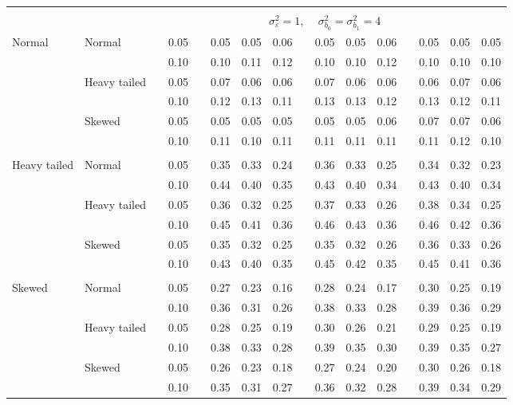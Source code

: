 \documentclass[12pt]{article} %
\begin{document}
\begin{table}[ht]
\begin{scriptsize}
\begin{center}
\begin{tabular}{ll p{.1cm} c p{.1cm} rrr p{.1cm} rrr p{.1cm} rrr}
&&&&&&&&&&&&&&&\\
& && && \multicolumn{9}{c}{$\sigma_{\varepsilon}^2 = 1$, \ \ $\sigma_{b_0}^2 = \sigma_{b_1}^2 = 4$} \\ \cline{6-16}
\rowcolor{gray!20}Normal       & Normal       && 0.05 &&   0.05 & 0.05 & 0.06 && 0.05 & 0.05 & 0.06 &&  0.05 & 0.05 & 0.05 \\
\rowcolor{gray!20}             &              && 0.10 &&   0.10 & 0.11 & 0.12 && 0.10 & 0.10 & 0.12 &&  0.10 & 0.10 & 0.10 \\
\rowcolor{gray!20}             & Heavy tailed && 0.05 &&   0.07 & 0.06 & 0.06 && 0.07 & 0.06 & 0.06 &&  0.06 & 0.07 & 0.06 \\
\rowcolor{gray!20}             &              && 0.10 &&   0.12 & 0.13 & 0.11 && 0.13 & 0.13 & 0.12 &&  0.13 & 0.12 & 0.11 \\
\rowcolor{gray!20}             & Skewed       && 0.05 &&   0.05 & 0.05 & 0.05 && 0.05 & 0.05 & 0.06 &&  0.07 & 0.07 & 0.06 \\
\rowcolor{gray!20}             &              && 0.10 &&   0.11 & 0.10 & 0.11 && 0.11 & 0.11 & 0.11 &&  0.11 & 0.12 & 0.10 \\
             &&&&&&&&&&&&&&&\\
Heavy tailed & Normal       && 0.05 &&   0.35 & 0.33 & 0.24 && 0.36 & 0.33 & 0.25 && 0.34 & 0.32 & 0.23 \\
             &              && 0.10 &&   0.44 & 0.40 & 0.35 && 0.43 & 0.40 & 0.34 && 0.43 & 0.40 & 0.34 \\
             & Heavy tailed && 0.05 &&   0.36 & 0.32 & 0.25 && 0.37 & 0.33 & 0.26 && 0.38 & 0.34 & 0.25 \\
             &              && 0.10 &&   0.45 & 0.41 & 0.36 && 0.46 & 0.43 & 0.36 && 0.46 & 0.42 & 0.36 \\
             & Skewed       && 0.05 &&   0.35 & 0.32 & 0.25 && 0.35 & 0.32 & 0.26 && 0.36 & 0.33 & 0.26 \\
             &              && 0.10 &&   0.43 & 0.40 & 0.35 && 0.45 & 0.42 & 0.35 && 0.45 & 0.41 & 0.36 \\
             &&&&&&&&&&&&&&&\\
Skewed       & Normal       && 0.05 &&   0.27 & 0.23 & 0.16 && 0.28 & 0.24 & 0.17 && 0.30 & 0.25 & 0.19 \\
             &              && 0.10 &&   0.36 & 0.31 & 0.26 && 0.38 & 0.33 & 0.28 && 0.39 & 0.36 & 0.29 \\
             & Heavy tailed && 0.05 &&   0.28 & 0.25 & 0.19 && 0.30 & 0.26 & 0.21 && 0.29 & 0.25 & 0.19 \\
             &              && 0.10 &&   0.38 & 0.33 & 0.28 && 0.39 & 0.35 & 0.30 && 0.39 & 0.35 & 0.27 \\
             & Skewed       && 0.05 &&   0.26 & 0.23 & 0.18 && 0.27 & 0.24 & 0.20 && 0.30 & 0.26 & 0.18 \\
             &              && 0.10 &&   0.35 & 0.31 & 0.27 && 0.36 & 0.32 & 0.28 && 0.39 & 0.34 & 0.29 \\


\end{tabular}
\end{center}
\end{scriptsize}
\end{table}
\end{document}
